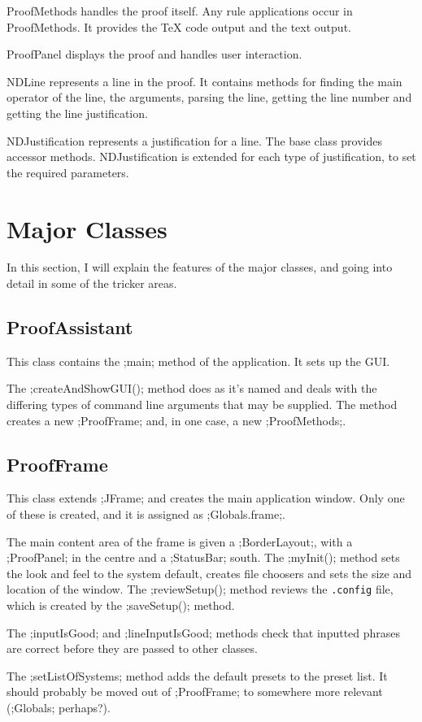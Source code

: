 \documentclass[a4paper]{article}
\begin{document}
ProofMethods handles the proof itself. Any rule applications occur in ProofMethods. It provides the TeX code output and the text output.

ProofPanel displays the proof and handles user interaction.

NDLine represents a line in the proof. It contains methods for finding the main operator of the line, the arguments, parsing the line, getting the line number and getting the line justification.

NDJustification represents a justification for a line. The base class provides accessor methods. NDJustification is extended for each type of justification, to set the required parameters.

\section{Major Classes}
In this section, I will explain the features of the major classes, and going into detail in some of the tricker areas.

\subsection{ProofAssistant}
This class contains the ;main; method of the application. It sets up the GUI.

The ;createAndShowGUI(); method does as it's named and deals with the differing types of command line arguments that may be supplied. The method creates a new ;ProofFrame; and, in one case, a new ;ProofMethods;.

\subsection{ProofFrame}
This class extends ;JFrame; and creates the main application window. Only one of these is created, and it is assigned as ;Globals.frame;.

The main content area of the frame is given a ;BorderLayout;, with a ;ProofPanel; in the centre and a ;StatusBar; south. The ;myInit(); method sets the look and feel to the system default, creates file choosers and sets the size and location of the window. The ;reviewSetup(); method reviews the \texttt{.config} file, which is created by the ;saveSetup(); method.

The ;inputIsGood; and ;lineInputIsGood; methods check that inputted phrases are correct before they are passed to other classes.


The ;setListOfSystems; method adds the default presets to the preset list. It should probably be moved out of ;ProofFrame; to somewhere more relevant (;Globals; perhaps?).
\end{document}
